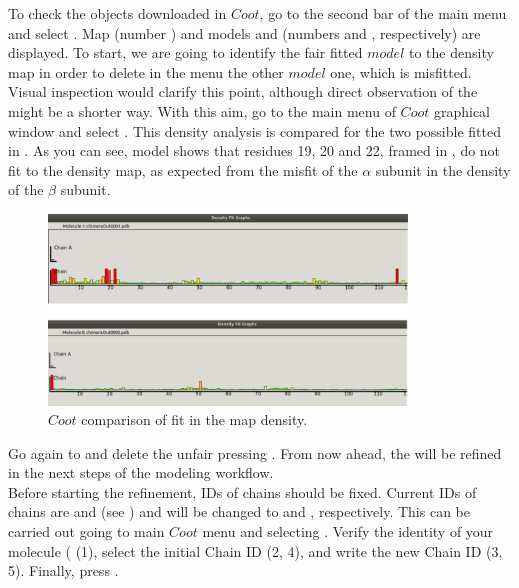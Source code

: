 \begin{itemize}
  To check the objects downloaded in $Coot$, go to the second bar of the main menu and select . Map  (number ) and models  and  (numbers  and , respectively) are displayed. To start, we are going to identify the fair fitted $model$ to the density map in order to delete in the  menu the other $model$ one, which is misfitted. Visual inspection would clarify this point, although direct observation of the  might be a shorter way. With this aim, go to the main menu of $Coot$ graphical window and select . This density analysis is compared for the two possible fitted  in . As you can see, model  shows that residues 19, 20 and 22, framed in , do not fit to the density map, as expected from the misfit of the $\alpha$ subunit in the density of the $\beta$ subunit.
 
 \begin{figure}[H]
  \centering 
  \captionsetup{width=.7\linewidth} 
  \includegraphics[width=0.85\textwidth]{Images/Fig25}
  \caption{$Coot$ comparison of  fit in the map density.}
  \label{fig:coot_density_fit_analysis}
  \end{figure}
  
  Go again to  and delete the unfair   pressing . From now ahead, the   will be refined in the next steps of the modeling workflow.\\
  
  Before starting the refinement, IDs of chains should be fixed. Current IDs of chains are  and  (see ) and will be changed to  and , respectively. This can be carried out going to main $Coot$ menu and selecting . Verify the identity of your  molecule ( (1), select the initial Chain ID (2, 4), and write the new Chain ID (3, 5). Finally, press .
 

\end{itemize}
